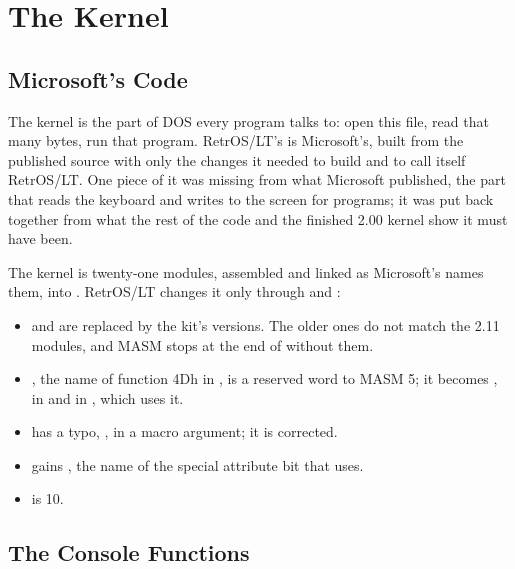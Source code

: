 \mwnewpart
\renewcommand\runningtitle{Section 4. The Kernel}
\chapter{The Kernel}
\sectioncontents

\section{Microsoft's Code}

\begin{plainwords}
The kernel is the part of DOS every program talks to: open this file, read
that many bytes, run that program. RetrOS/LT's is Microsoft's, built from
the published source with only the changes it needed to build and to call
itself RetrOS/LT. One piece of it was missing from what Microsoft
published, the part that reads the keyboard and writes to the screen for
programs; it was put back together from what the rest of the code and the
finished 2.00 kernel show it must have been.
\end{plainwords}

The kernel is twenty-one modules, assembled and linked as Microsoft's
 names them, into . RetrOS/LT changes it
only through  and :

\begin{itemize}
\item {} and  are replaced by the kit's
   versions. The older ones do not match the 2.11 modules,
  and MASM stops at the end of  without them.
\item {}, the name of function 4Dh in , is a
  reserved word to MASM 5; it becomes , in
   and in , which uses it.
\item {} has a typo, , in a macro
  argument; it is corrected.
\item {} gains , the name of the special
  attribute bit that  uses.
\item {} is 10.
\end{itemize}

\section{The Console Functions}

